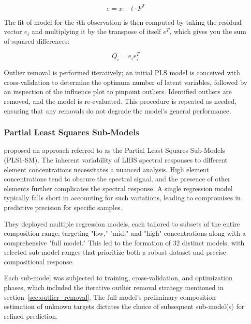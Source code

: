 \begin{equation}
    e = x - t \cdot P^T
\end{equation}

The fit of model for the $i$th observation is then computed by taking the residual vector $e_i$ and multiplying it by the transpose of itself $e^T$, which gives you the sum of squared differences: 

\begin{equation}
    Q_i = e_{i}e_{i}^T
\end{equation} \cite{marini_chemometrics_2013} \citet{andersonImprovedAccuracyQuantitative2017}

Outlier removal is performed iteratively; an initial PLS model is conceived with cross-validation to determine the optimum number of latent variables, followed by an inspection of the influence plot to pinpoint outliers. Identified outliers are removed, and the model is re-evaluated. This procedure is repeated as needed, ensuring that any removals do not degrade the model's general performance.


\subsubsection{Partial Least Squares Sub-Models}\label{sec:pls_submodels}

\citet{andersonImprovedAccuracyQuantitative2017} proposed an approach referred to as the Partial Least Squares Sub-Models (PLS1-SM).
The inherent variability of LIBS spectral responses to different element concentrations necessitates a nuanced analysis. High element concentrations tend to obscure the spectral signal, and the presence of other elements further complicates the spectral response. A single regression model typically falls short in accounting for such variations, leading to compromises in predictive precision for specific samples.

They deployed multiple regression models, each tailored to subsets of the entire composition range, targeting "low," "mid," and "high" concentrations along with a comprehensive "full model." This led to the formation of 32 distinct models, with selected sub-model ranges that prioritize both a robust dataset and precise compositional response.

Each sub-model was subjected to training, cross-validation, and optimization phases, which included the iterative outlier removal strategy mentioned in section~\ref{sec:outlier_removal}. The full model's preliminary composition estimation of unknown targets dictates the choice of subsequent sub-model(s) for refined prediction.

